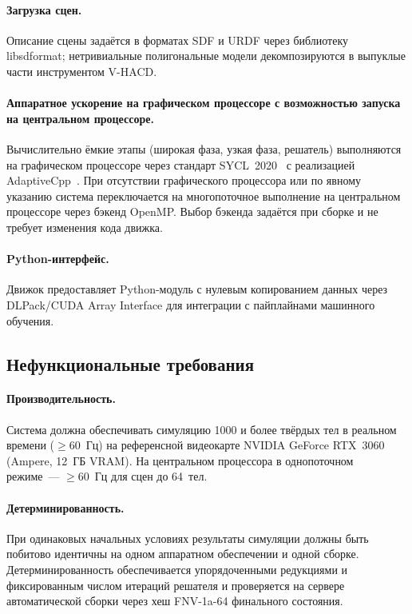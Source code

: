 \paragraph{Загрузка сцен.} Описание сцены задаётся в форматах SDF и URDF через библиотеку libsdformat; 
нетривиальные полигональные модели декомпозируются в выпуклые части инструментом V-HACD.

\paragraph{Аппаратное ускорение на графическом процессоре с возможностью запуска на центральном процессоре.} 
Вычислительно ёмкие этапы (широкая фаза, узкая фаза, решатель) выполняются на графическом процессоре через стандарт
SYCL~2020~\cite{sycl2020spec} с реализацией AdaptiveCpp~\cite{adaptivecpp2024}. При отсутствии графического процессора или по 
явному указанию система переключается на многопоточное выполнение на центральном процессоре через бэкенд OpenMP. Выбор бэкенда 
задаётся при сборке и не требует изменения кода движка.

\paragraph{Python-интерфейс.} Движок предоставляет Python-модуль с нулевым копированием данных через 
DLPack/CUDA Array Interface для интеграции с пайплайнами машинного обучения.

\subsection{Нефункциональные требования}

\paragraph{Производительность.} Система должна обеспечивать симуляцию 1000 и более твёрдых тел в реальном 
времени ($\geq 60$~Гц) на референсной видеокарте NVIDIA GeForce RTX~3060 (Ampere, 12~ГБ VRAM). На центральном процессора в 
однопоточном режиме~--- $\geq 60$~Гц для сцен до 64~тел.

\paragraph{Детерминированность.} При одинаковых начальных условиях результаты симуляции должны быть побитово 
идентичны на одном аппаратном обеспечении и одной сборке. Детерминированность обеспечивается упорядоченными 
редукциями и фиксированным числом итераций решателя и проверяется на сервере автоматической сборки через хеш 
FNV-1a-64 финального состояния.

